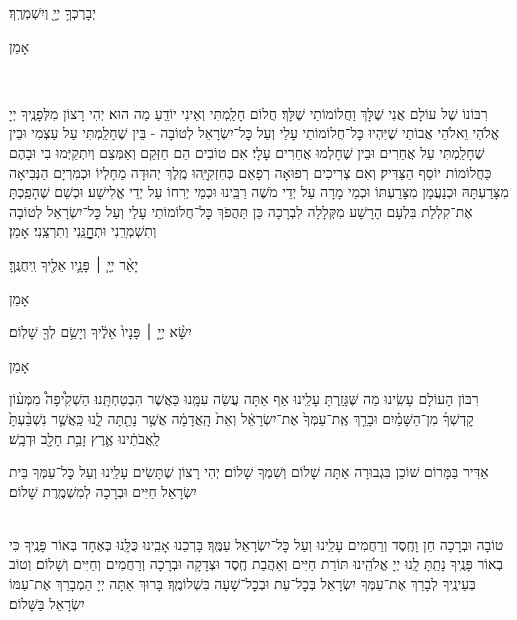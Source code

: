 \documentclass[twoside, openany, parskip=half, 11pt]{book}
\begin{document}
יְבָרֶכְךָ֥ יְיָ֖ וְיִשְׁמְרֶֽךָ׃ 
\kahal \begin{large} אָמֵן \end{large}
\\
\begin{footnotesize}
רִבּוֹנוֹ שֶׁל עוֹלָם אֲנִי שֶׁלָּךְ וַחֲלוֹמוֹתַי שֶׁלָּךְ׃ חֲלוֹם חָלַֽמְתִּי וְאֵינִי יוֹדֵֽעַ מַה הוּא׃ יְהִי רָצוֹן מִלְּפָנֶֽיךָ יְיָ אֱלֹהַי וֵאלֹהֵי אֲבוֹתַי שֶׁיִּהְיוּ כׇּל־חֲלוֹמוֹתַי עָלַי וְעַל כׇּל־יִשְׂרָאֵל לְטוֹבָה - בֵּין שֶׁחָלַֽמְתִּי עַל עַצְמִי וּבֵין שֶׁחָלַֽמְתִּי עַל אֲחֵרִים וּבֵין שֶׁחָלְמוּ אֲחֵרִים עָלָי׃ אִם טוֹבִים הֵם חַזְּקֵם וְאַמְּצֵם וְיִתְקַיְּמוּ בִי וּבָהֶם כַּחֲלוֹמוֹת יוֹסֵף הַצַּדִּיק׃ וְאִם צְרִיכִים רְפוּאָה רְפָאֵם כְּחִזְקִיָּֽהוּ מֶֽלֶךְ יְהוּדָה מֵחָלְיוֹ וּכְמִרְיָם הַנְּבִיאָה מִצָּרַעְתָּהּ וּכְנַעֲמָן מִצָּרַעְתּוֹ וּכְמֵי מָרָה עַל יְדֵי מֹשֶׁה רַבֵּֽינוּ וּכְמֵי יְרִחוֹ עַל יְדֵי אֱלִישָׁע׃ וּכְשֵׁם שֶׁהָפַֽכְתָּ אֶת־קִלְלַת בִּלְעָם הָרָשָׁע מִקְּלָלָה לִבְרָכָה כֵּן תַּהֲפֹךְ כׇּל־חֲלוֹמוֹתַי עָלַי וְעַל כׇּל־יִשְׂרָאֵל לְטוֹבָה וְתִשְׁמְרֵֽנִי וּתְחׇׇׇׇׇׇנֵּֽנִי וְתִרְצֵֽנִי׃ אָמֵן׃
\end{footnotesize}

יָאֵ֨ר יְיָ֧ ׀ פָּנָ֛יו אֵלֶ֖יךָ וִֽיחֻנֶּֽךָּ׃
\kahal \begin{large} אָמֵן \end{large}

יִשָּׂ֨א יְיָ֤ ׀ פָּנָיו֙ אֵלֶ֔יךָ וְיָשֵׂ֥ם לְךָ֖ שָׁלֽוֹם׃
\kahal \begin{large} אָמֵן \end{large}

\begin{paracol}{2}
רִבּוֹן הָעוֹלָם עָשִֽׂינוּ מַה שֶּׁגָּזַֽרְתָּ עָלֵֽינוּ אַף אַתָּה עֲשֵׂה עִמָּֽנוּ כַּאֲשֶׁר הִבְטַחְתָּֽנוּ׃ הַשְׁקִ֩יפָה֩ מִמְּע֨וֹן קׇדְשְׁךָ֜ מִן־הַשָּׁמַ֗יִם וּבָרֵ֤ךְ אֶֽת־עַמְּךָ֙ אֶת־יִשְׂרָאֵ֔ל וְאֵת֙ הָֽאֲדָמָ֔ה אֲשֶׁ֥ר נָתַ֖תָּה לָ֑נוּ כַּֽאֲשֶׁ֤ר נִשְׁבַּ֨עְתָּ֙ לַֽאֲבֹתֵ֔ינוּ אֶ֛רֶץ זָבַ֥ת חָלָ֖ב וּדְבָֽשׁ׃

\switchcolumn

\kahal
אַדִּיר בַּמָּרוֹם שׁוֹכֵן בִּגְבוּרָה אַתָּה שָׁלוֹם וְשִׁמְךָ שָׁלוֹם׃ יְהִי רָצוֹן שֶׁתָּשִׂים עָלֵֽינוּ וְעַל כׇּל־עַמְּךָ בֵּית יִשְׂרָאֵל חַיִּים וּבְרָכָה לְמִשְׁמֶֽרֶת שָׁלוֹם׃
\end{paracol}



\shatz\\
טוֹבָה וּבְרָכָה חֵן וָחֶֽסֶד וְרַחֲמִים עָלֵֽינוּ וְעַל כׇּל־יִשְׂרָאֵל עַמֶּֽךָ׃ בָּרְכֵנוּ אָבִֽינוּ כֻּלָּֽנוּ כְּאֶחָד בְּאוֹר פָּנֶֽיךָ כִּי בְאוֹר פָּנֶֽיךָ נָתַֽתָּ לָֽנוּ יְיָ אֱלֹהֵֽינוּ תּוֹרַת חַיִּים וְאַהֲבַת חֶֽסֶד וּצְדָקָה וּבְרָכָה וְרַחֲמִים וְחַיִּים וְשָׁלוֹם׃ וְטוֹב בְּעֵינֶֽיךָ לְבָרֵךְ אֶת־עַמְּךָ יִשְׂרָאֵל בְּכׇל־עֵת וּבְכׇל־שָׁעָה בִּשְׁלוֹמֶֽךָ׃ בָּרוּךְ אַתָּה יְיָ הַמְבָרֵךְ אֶת־עַמּוֹ יִשְׂרָאֵל בַּשָּׁלוֹם׃
\end{document}
